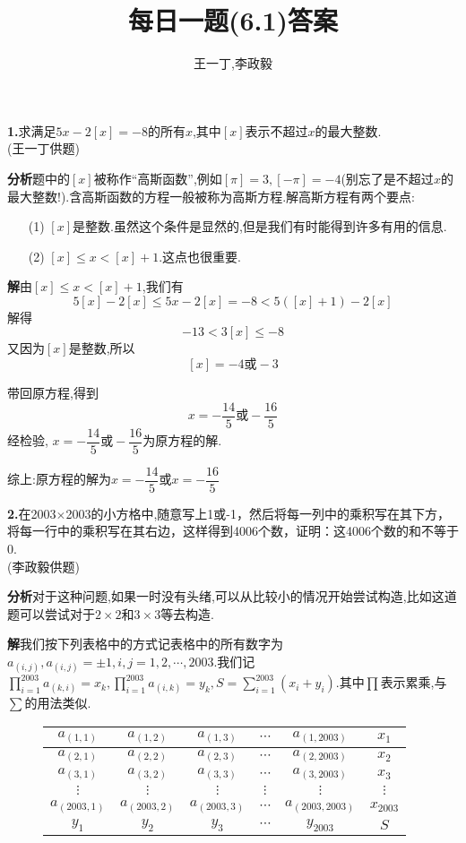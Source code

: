 \documentclass[UTF8]{ctexart}
\title{每日一题(6.1)答案}
\author{王一丁,李政毅}
\begin{document}
\maketitle
\textbf{1.}{求满足$ 5x-2[x]=-8 $的所有$ x $,其中$ [x] $表示不超过$ x $的最大整数.\\
(王一丁供题)}\\
\par \textbf{分析}\quad 题中的$ [x] $被称作“高斯函数”,例如$ [\pi] =3,[-\pi]=-4$(别忘了是不超过$ x $的最大整数!).含高斯函数的方程一般被称为高斯方程.解高斯方程有两个要点:
\begin{itemize}
	\item[(1)]$ [x] $是整数.虽然这个条件是显然的,但是我们有时能得到许多有用的信息.
	\item[(2)]$ [x]\le x<[x]+1 $.这点也很重要.
\end{itemize}
\par\textbf{解}\quad 由$ [x]\le x<[x]+1 $,我们有
\[5[x]-2[x]\le 5x-2[x]=-8<5([x]+1)-2[x]\]
解得
\[-13<3[x]\le-8\]
又因为$ [x] $是整数,所以
\[ [x]=-4\text{或}-3 \]
\par 带回原方程,得到
\[ x=-\frac{14}{5}\text{或}-\frac{16}{5} \]
经检验, $x=-\dfrac{14}{5}\text{或}-\dfrac{16}{5}$为原方程的解.
\par 综上:原方程的解为$x=-\dfrac{14}{5}\text{或}x=-\dfrac{16}{5}$

\par \textbf{2.}{在2003$ \times $2003的小方格中,随意写上1或-1，然后将每一列中的乘积写在其下方，将每一行中的乘积写在其右边，这样得到4006个数，证明：这4006个数的和不等于0.\\
(李政毅供题)}
\par \textbf{分析}\quad 对于这种问题,如果一时没有头绪,可以从比较小的情况开始尝试构造,比如这道题可以尝试对于$ 2\times 2 $和$ 3\times 3 $等去构造.
\par\textbf{解}\quad 我们按下列表格中的方式记表格中的所有数字为$ a_{(i,j)} ,a_{(i,j)}=\pm 1,i,j=1,2,\cdots ,2003$.我们记$ \prod\limits_{i=1}^{2003} a_{(k,i)}=x_k,\prod\limits_{i=1}^{2003} a_{(i,k)}=y_k,S=\sum\limits_{i=1}^{2003}(x_i+y_i)$.其中$ \prod $表示累乘,与$ \sum $的用法类似.

\begin{figure}[H]
	\centering
	\begin{tabular}{|c|c|c|c|c|c}
		\hline 
		$ a_{(1,1)} $&$ a_{(1,2)} $&$ a_{(1,3)} $&$ \cdots $&$ a_{(1,2003)} $&$ x_1 $\\
		\hline 
		$ a_{(2,1)} $&$ a_{(2,2)} $&$ a_{(2,3)} $&$ \cdots $&$ a_{(2,2003)}$&$ x_2 $\\
		\hline 
		$ a_{(3,1)} $&$ a_{(3,2)} $&$ a_{(3,3)} $&$ \cdots $&$ a_{(3,2003)} $&$ x_3 $\\
		\hline 
		$ \vdots $&$ \vdots $&$ \vdots $&$ \vdots $&$ \vdots $&$ \vdots $\\
		\hline 
		$ a_{(2003,1)} $&$ a_{(2003,2)} $&$ a_{(2003,3)}$&$ \cdots $&$ a_{(2003,2003)} $&$ x_{2003} $\\
		\hline
		$ y_1 $&$ y_2 $&$ y_3 $&$ \cdots $&$ y_{2003} $&$ S $\\
	\end{tabular}
\end{figure}
\end{document}
